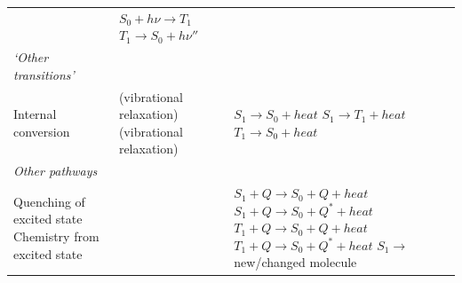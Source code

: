 \documentclass[
]{book}
\begin{document}
\begin{longtable}[]{@{}lll@{}}
\begin{minipage}[t]{0.26\columnwidth}
\end{minipage} & \begin{minipage}[t]{0.26\columnwidth}\raggedright
\(S_0 + h \nu \longrightarrow T_1\) \(T_1 \longrightarrow S_0 + h \nu ''\)\strut
\end{minipage}\tabularnewline
\begin{minipage}[t]{0.39\columnwidth}\raggedright
\emph{`Other transitions'}\strut
\end{minipage} & \begin{minipage}[t]{0.26\columnwidth}\raggedright
\strut
\end{minipage} & \begin{minipage}[t]{0.26\columnwidth}\raggedright
\strut
\end{minipage}\tabularnewline
\begin{minipage}[t]{0.39\columnwidth}\raggedright
Internal conversion \strut
\end{minipage} & \begin{minipage}[t]{0.26\columnwidth}\raggedright
(vibrational relaxation) (vibrational relaxation)\strut
\end{minipage} & \begin{minipage}[t]{0.26\columnwidth}\raggedright
\(S_1 \longrightarrow S_0 + heat\) \(S_1 \longrightarrow T_1 + heat\) \(T_1 \longrightarrow S_0 + heat\)\strut
\end{minipage}\tabularnewline
\begin{minipage}[t]{0.39\columnwidth}\raggedright
\emph{Other pathways}\strut
\end{minipage} & \begin{minipage}[t]{0.26\columnwidth}\raggedright
\strut
\end{minipage} & \begin{minipage}[t]{0.26\columnwidth}\raggedright
\strut
\end{minipage}\tabularnewline
\begin{minipage}[t]{0.39\columnwidth}\raggedright
Quenching of excited state Chemistry from excited state\strut
\end{minipage} & \begin{minipage}[t]{0.26\columnwidth}\raggedright
\strut
\end{minipage} & \begin{minipage}[t]{0.26\columnwidth}\raggedright
\(S_1 + Q \longrightarrow S_0 + Q +heat\) \(S_1 + Q \longrightarrow S_0 + Q^\ast +heat\) \(T_1 + Q \longrightarrow S_0 + Q +heat\) \(T_1 + Q \longrightarrow S_0 + Q^\ast +heat\) \(S_1 \longrightarrow\) new/changed molecule\strut
\end{minipage}\tabularnewline
\bottomrule
\end{longtable}
\end{document}

